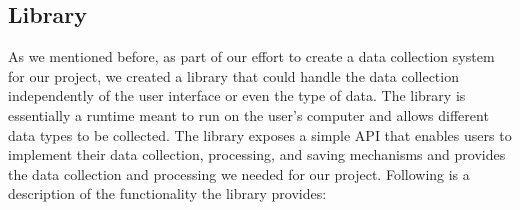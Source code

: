

\subsection{Library}
As we mentioned before, as part of our effort to create a data collection system for our project,
 we created a library that could handle the data collection independently of the user interface or even the type of data. 
 The library is essentially a runtime meant to run on the user's computer and allows different data types to be collected. 
 The library exposes a simple API that enables users to implement their data collection, 
 processing, and saving mechanisms and provides the data collection and processing we needed for our project. Following is a description of 
 the functionality the library provides: 

